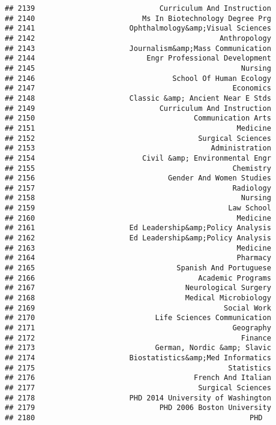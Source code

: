 \documentclass[
]{article}
\begin{document}
\begin{verbatim}
## 2139                             Curriculum And Instruction
## 2140                         Ms In Biotechnology Degree Prg
## 2141                      Ophthalmology&amp;Visual Sciences
## 2142                                           Anthropology
## 2143                      Journalism&amp;Mass Communication
## 2144                          Engr Professional Development
## 2145                                                Nursing
## 2146                                School Of Human Ecology
## 2147                                              Economics
## 2148                      Classic &amp; Ancient Near E Stds
## 2149                             Curriculum And Instruction
## 2150                                     Communication Arts
## 2151                                               Medicine
## 2152                                      Surgical Sciences
## 2153                                         Administration
## 2154                         Civil &amp; Environmental Engr
## 2155                                              Chemistry
## 2156                               Gender And Women Studies
## 2157                                              Radiology
## 2158                                                Nursing
## 2159                                             Law School
## 2160                                               Medicine
## 2161                      Ed Leadership&amp;Policy Analysis
## 2162                      Ed Leadership&amp;Policy Analysis
## 2163                                               Medicine
## 2164                                               Pharmacy
## 2165                                 Spanish And Portuguese
## 2166                                      Academic Programs
## 2167                                   Neurological Surgery
## 2168                                   Medical Microbiology
## 2169                                            Social Work
## 2170                            Life Sciences Communication
## 2171                                              Geography
## 2172                                                Finance
## 2173                            German, Nordic &amp; Slavic
## 2174                      Biostatistics&amp;Med Informatics
## 2175                                             Statistics
## 2176                                     French And Italian
## 2177                                      Surgical Sciences
## 2178                      PHD 2014 University of Washington
## 2179                             PHD 2006 Boston University
## 2180                                                  PHD  

\end{verbatim}
\end{document}
